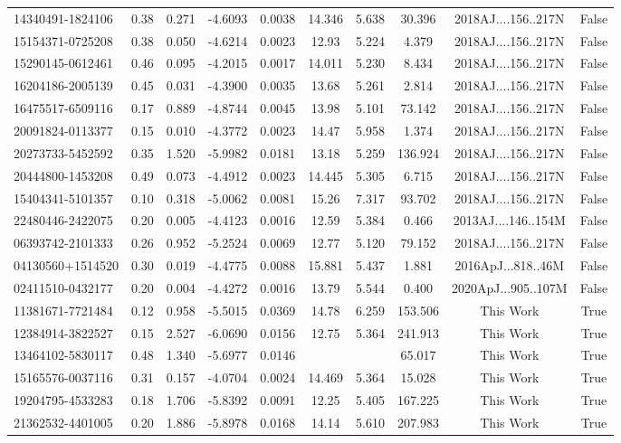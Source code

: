 \begin{tabular}{lccccccccc}
14340491-1824106 & 0.38 & 0.271 & -4.6093 & 0.0038 & 14.346 & 5.638 & 30.396 & 2018AJ....156..217N & False \\
15154371-0725208 & 0.38 & 0.050 & -4.6214 & 0.0023 & 12.93 & 5.224 & 4.379 & 2018AJ....156..217N & False \\
15290145-0612461 & 0.46 & 0.095 & -4.2015 & 0.0017 & 14.011 & 5.230 & 8.434 & 2018AJ....156..217N & False \\
16204186-2005139 & 0.45 & 0.031 & -4.3900 & 0.0035 & 13.68 & 5.261 & 2.814 & 2018AJ....156..217N & False \\
16475517-6509116 & 0.17 & 0.889 & -4.8744 & 0.0045 & 13.98 & 5.101 & 73.142 & 2018AJ....156..217N & False \\
20091824-0113377 & 0.15 & 0.010 & -4.3772 & 0.0023 & 14.47 & 5.958 & 1.374 & 2018AJ....156..217N & False \\
20273733-5452592 & 0.35 & 1.520 & -5.9982 & 0.0181 & 13.18 & 5.259 & 136.924 & 2018AJ....156..217N & False \\
20444800-1453208 & 0.49 & 0.073 & -4.4912 & 0.0023 & 14.445 & 5.305 & 6.715 & 2018AJ....156..217N & False \\
15404341-5101357 & 0.10 & 0.318 & -5.0062 & 0.0081 & 15.26 & 7.317 & 93.702 & 2018AJ....156..217N & False \\
22480446-2422075 & 0.20 & 0.005 & -4.4123 & 0.0016 & 12.59 & 5.384 & 0.466 & 2013AJ....146..154M & False \\
06393742-2101333 & 0.26 & 0.952 & -5.2524 & 0.0069 & 12.77 & 5.120 & 79.152 & 2018AJ....156..217N & False \\
04130560+1514520 & 0.30 & 0.019 & -4.4775 & 0.0088 & 15.881 & 5.437 & 1.881 & 2016ApJ...818..46M & False \\
02411510-0432177 & 0.20 & 0.004 & -4.4272 & 0.0016 & 13.79 & 5.544 & 0.400 & 2020ApJ...905..107M & False \\
11381671-7721484 & 0.12 & 0.958 & -5.5015 & 0.0369 & 14.78 & 6.259 & 153.506 & This Work & True \\
12384914-3822527 & 0.15 & 2.527 & -6.0690 & 0.0156 & 12.75 & 5.364 & 241.913 & This Work & True \\
13464102-5830117 & 0.48 & 1.340 & -5.6977 & 0.0146 &  &  & 65.017 & This Work & True \\
15165576-0037116 & 0.31 & 0.157 & -4.0704 & 0.0024 & 14.469 & 5.364 & 15.028 & This Work & True \\
19204795-4533283 & 0.18 & 1.706 & -5.8392 & 0.0091 & 12.25 & 5.405 & 167.225 & This Work & True \\
21362532-4401005 & 0.20 & 1.886 & -5.8978 & 0.0168 & 14.14 & 5.610 & 207.983 & This Work & True \\
\hline
\end{tabular}


